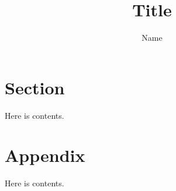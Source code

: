 \documentclass{manuscript}
\begin{document}
\title{
    Title
}
\author{Name}
\maketitle
\section{Section}
Here is contents. \cite{citationkey}



\appendix
\section{Appendix}
Here is contents.
\end{document}
